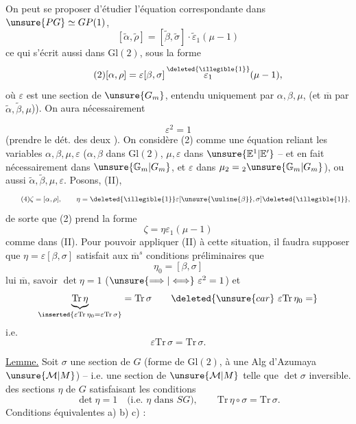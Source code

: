 On peut se proposer d'étudier l'équation correspondante dans
$\unsure{PG}\simeq GP(1)$,
\[
\tag{1}
[\widetilde\alpha,\widetilde\rho]
 =[\widetilde\beta,\widetilde\sigma]\cdot\widetilde\varepsilon_1(\mu-1)
\]
ce qui s'écrit aussi dans $\mathrm{Gl}(2)$, sous la forme 
\[
\tag{2}
[\alpha,\rho]=\varepsilon[\beta,\sigma]\,
\overset{\deleted{\illegible{1}}}{\varepsilon_1}(\mu-1),
\]
où $\varepsilon$ est une section de $\unsure{G_m}$,
  entendu uniquement
 par $\alpha,\beta,\mu$,
(et $\overline{\mathrm m}$ par $\widetilde\alpha,\widetilde\beta,\mu$)).
On aura nécessairement


\[
\tag{3}
\varepsilon^2=1
\]
(prendre le dét. des deux ). On considère (2) comme une équation
reliant les variables $\alpha,\beta,\mu,\varepsilon$
($\alpha,\beta$ dans $\mathrm{Gl}(2)$, $\mu,\varepsilon$ dans
$\unsure{\mathbb E^1|\mathbb E'}$ -- et en fait nécessairement dans
$\unsure{\mathbb G_m|G_m}$, et $\varepsilon$  dans
$\mu_2={}_2\unsure{\mathbb G_m|G_m}$), ou aussi
$\widetilde\alpha,\widetilde\beta,\mu,\varepsilon$.
Posons,  (II),
\[
\tag{4}
\zeta=[\alpha,\rho],\qquad
\eta=\deleted{\illegible{1}}\varepsilon
[\unsure{\uuline{\beta}},\sigma]\deleted{\illegible{1}},
\]
de sorte que (2) prend la forme
\[
\tag{5}
\zeta=\eta\varepsilon_1(\mu-1)
\]
comme dans (II). Pour pouvoir appliquer (II) à cette situation, il faudra
supposer que $\eta=\varepsilon[\beta,\sigma]$ satisfait aux
$\overline{\mathrm m}^{s}$ conditions préliminaires que
\[
\eta_0=[\beta,\sigma]
\]
lui $\overline{\mathrm m}$, savoir $\det\eta=1$
($\unsure{\Longrightarrow|\Longleftrightarrow}\ \varepsilon^2=1$) et
\[
\underbrace{\mathrm{Tr}\,\eta}_{\inserted{\varepsilon\mathrm{Tr}\,\eta_0
=\varepsilon\mathrm{Tr}\,\sigma}}
=\mathrm{Tr}\,\sigma
\qquad\deleted{\unsure{car}\ \varepsilon\mathrm{Tr}\,\eta_0=}
\]
i.e.
\[
\varepsilon\mathrm{Tr}\,\sigma=\mathrm{Tr}\,\sigma.
\]


\uline{Lemme.} Soit $\sigma$ une section de $G$ (forme de
$\mathrm{Gl}(2)$,  à une Alg d'Azumaya
$\unsure{\mathcal M|M}$) -- i.e. une section de
$\unsure{\mathcal M|M}$ telle que $\det\sigma$ inversible.
des sections $\eta$  de $G$ satisfaisant les conditions
\[
\det\eta=1\quad\text{(i.e. $\eta$ dans $SG$)},\qquad
\mathrm{Tr}\,\eta\circ\sigma=\mathrm{Tr}\,\sigma.
\]
Conditions équivalentes a) b) c) :

